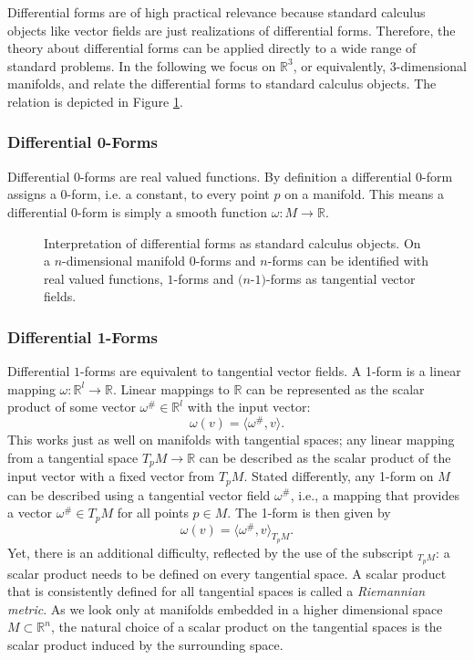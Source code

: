 \label{subsec:diffformsare}
Differential forms are of high practical relevance because standard calculus objects like vector fields are just realizations of differential forms. Therefore, the theory about differential forms can be applied directly to a wide range of standard problems. In the following we focus on $\mathbb R^3$, or equivalently, 3-dimensional manifolds, and relate the differential forms to standard calculus objects. The relation is depicted in Figure \ref{fig:4_difformsAre}.

\subsubsection{Differential 0-Forms}
Differential 0-forms are real valued functions. By definition a differential 0-form assigns a 0-form, i.e. a constant, to every point $p$ on a manifold. This means a differential 0-form is simply a smooth function $\omega: M \to \mathbb R$. 


\begin{figure}%
\def\svgwidth{\columnwidth}

\caption{Interpretation of differential forms as standard calculus objects. On a $n$-dimensional manifold $0$-forms and $n$-forms can be identified with real valued functions, $1$-forms and $(n$-$1)$-forms as tangential vector fields.}%
\label{fig:4_difformsAre}%
\end{figure}

\subsubsection*{Differential 1-Forms}
Differential $1$-forms are equivalent to tangential vector fields. A 1-form is a linear mapping $\omega: \mathbb R^l \rightarrow \mathbb R$. Linear mappings to $\mathbb R$ can be represented as the scalar product of some vector $\omega^{\#} \in \mathbb R ^l$ with the input vector:
\[\omega(v) = \langle \omega^{\#}, v \rangle.\]
This works just as well on manifolds with tangential spaces; any linear mapping from a tangential space $T_pM \rightarrow \mathbb R$ can be described as the scalar product of the input vector with a fixed vector from $T_pM$. Stated differently, any 1-form on $M$ can be described using a tangential vector field $\omega^{\#}$, i.e., a mapping that provides a vector $\omega^{\#} \in T_pM$ for all points $p\in M$. The 1-form is then given by
\[\omega(v) = \langle \omega^{\#},v \rangle_{T_pM}.\]
 Yet, there is an additional difficulty, reflected by the use of the subscript $_{T_pM}$: a scalar product needs to be defined on every tangential space. A scalar product that is consistently defined for all tangential spaces is called a \emph{Riemannian metric}. As we look only at manifolds embedded in a higher dimensional space $M \subset \mathbb R^n$, the natural choice of a scalar product on the tangential spaces is the scalar product induced by the surrounding space. 

